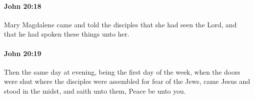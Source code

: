 		\paragraph{John 20:18} %
			\label{JOHN-20-18}

			Mary Magdalene came and told the disciples that she had seen the Lord, and that he had spoken these things unto her.

			\begin{framed}
				\scriptsize
				\begin{compactdesc}
					\item[SBLG] 
				\end{compactdesc}
			\end{framed}

		\paragraph{John 20:19} %
			\label{JOHN-20-19}

			Then the same day at evening, being the first day of the week, when the doors were shut where the disciples were assembled for fear of the Jews, came Jesus and stood in the midst, and saith unto them, Peace be unto you.

